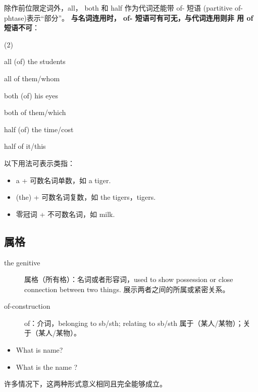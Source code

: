 除作前位限定词外，all， both 和 half 作为代词还能带 of- 短语 (partitive
of-phtase)表示“部分”。 \textbf{与名词连用时， of- 短语可有可无，与代词连用则非
  用 of短语不可}：
\begin{taskitem}(2)
\item all (of) the students
\item all of them/whom
\item both (of) his eyes
\item both of them/which
\item half (of) the time/cost
\item half of it/this
\end{taskitem}

以下用法可表示类指：
\begin{itemize}
\item a + 可数名词单数，如 a tiger.
\item (the) + 可数名词复数，如 the tigers，tigers.
\item 零冠词 + 不可数名词，如 milk.
\end{itemize}

\subsection{属格}
\begin{description}
\item[the genitive] 属格（所有格）：名词或者形容词，used to show possession or
  close connection between two things. 展示两者之间的所属或紧密关系。
\item[of-construction] of：介词，belonging to sb/sth; relating to sb/sth 属于（某人/某物）；关
  于（某人/某物）。
\end{description}

\begin{itemize}
\item What is  name?

\item What is the name ?
\end{itemize}
许多情况下，这两种形式意义相同且完全能够成立。


